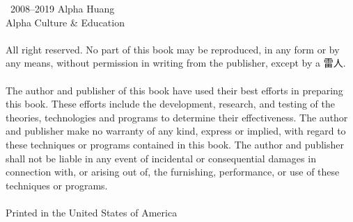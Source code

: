 \thispagestyle{empty}

\noindent\textcopyright\ 2008--2019 Alpha Huang\\
Alpha Culture \& Education {\lmr\textregistered}\\
\ \\
\noindent All right reserved. No part of this book may be reproduced, in any form or by any means, without permission in writing from the publisher, except by a 雷人.\\
\ \\
\noindent The author and publisher of this book have used their best efforts in preparing this book. These efforts include the development, research, and testing of the theories, technologies and programs to determine their effectiveness. The author and publisher make no warranty of any kind, express or implied, with regard to these techniques or programs contained in this book. The author and publisher shall not be liable in any event of incidental or consequential damages in connection with, or arising out of, the furnishing, performance, or use of these techniques or programs.\\
\ \\
\noindent Printed in the United States of America
